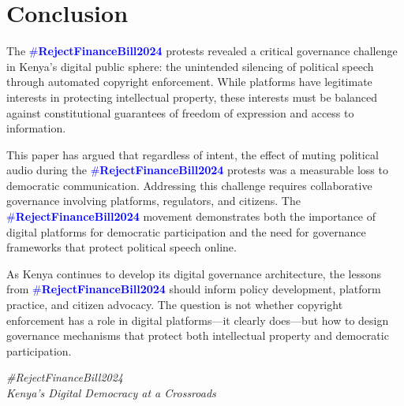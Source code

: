 \documentclass{article}
\newcommand{\rejectbill}{\textcolor{blue}{\#\textbf{RejectFinanceBill2024}}}
\begin{document}
\section{Conclusion}

The \rejectbill{} protests revealed a critical governance challenge in Kenya's digital public sphere: the unintended silencing of political speech through automated copyright enforcement. While platforms have legitimate interests in protecting intellectual property, these interests must be balanced against constitutional guarantees of freedom of expression and access to information.

This paper has argued that regardless of intent, the effect of muting political audio during the \rejectbill{} protests was a measurable loss to democratic communication. Addressing this challenge requires collaborative governance involving platforms, regulators, and citizens. The \rejectbill{} movement demonstrates both the importance of digital platforms for democratic participation and the need for governance frameworks that protect political speech online.

As Kenya continues to develop its digital governance architecture, the lessons from \rejectbill{} should inform policy development, platform practice, and citizen advocacy. The question is not whether copyright enforcement has a role in digital platforms—it clearly does—but how to design governance mechanisms that protect both intellectual property and democratic participation.

\vspace{1cm}
\begin{center}
\textit{\#RejectFinanceBill2024} \\
\textit{Kenya's Digital Democracy at a Crossroads}
\end{center}
\end{document}
